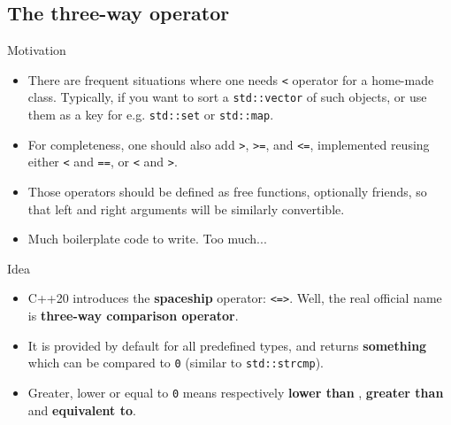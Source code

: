 \subsection[spaceship]{The three-way operator}

\begin{frame}[fragile]
  \begin{block}{Motivation}
    \begin{itemize}
    \item There are frequent situations where one needs \texttt{<} operator for a home-made class. Typically, if you want to sort a \texttt{std::vector} of such objects, or use them as a key for e.g. \texttt{std::set} or \texttt{std::map}.
    \item For completeness, one should also add \texttt{>}, \texttt{>=}, and \texttt{<=}, implemented reusing either \texttt{<} and \texttt{==}, or \texttt{<} and \texttt{>}.
    \item Those operators should be defined as free functions, optionally friends, so that left and right arguments will be similarly convertible.
    \item Much boilerplate code to write. Too much...
    \end{itemize}
  \end{block}
\end{frame}

\begin{frame}[fragile]
  \begin{block}{Idea}
    \begin{itemize}
    \item C++20 introduces the \textbf{spaceship} operator: \texttt{<=>}. Well, the real official name is \textbf{three-way comparison operator}.
    \item It is provided by default for all predefined types, and returns \textbf{something} which can be compared to \texttt{0} (similar to \texttt{std::strcmp}).
    \item Greater, lower or equal to \texttt{0} means respectively \textbf{lower than} , \textbf{greater than} and \textbf{equivalent to}.
    \end{itemize}
  \end{block}
\end{frame}

